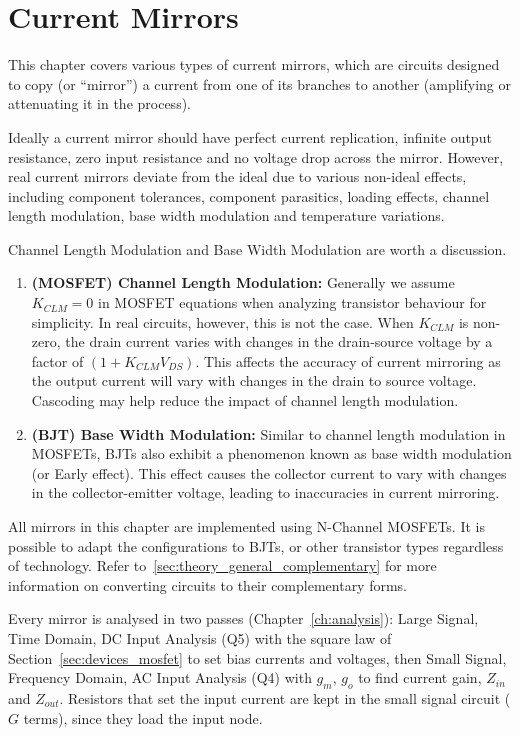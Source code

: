\chapter{Current Mirrors}\label{ch:Current_Mirrors}

This chapter covers various types of current mirrors,
which are circuits designed to copy (or ``mirror'') a current
from one of its branches to another (amplifying or attenuating
it in the process).

Ideally a current mirror should have perfect current
replication, infinite output resistance, zero input
resistance and no voltage drop across the mirror. However,
real current mirrors deviate from the ideal due to various
non-ideal effects, including component tolerances, component
parasitics, loading effects, channel length modulation,
base width modulation and temperature variations.

Channel Length Modulation and Base Width Modulation are
worth a discussion.
\begin{enumerate}
  \item \textbf{(MOSFET) Channel Length Modulation:} Generally
    we assume $K_{CLM} = 0$ in MOSFET equations when analyzing
    transistor behaviour for simplicity. In real circuits,
    however, this is not the case. When $K_{CLM}$ is non-zero,
    the drain current varies with changes in the drain-source
    voltage by a factor of $(1 + K_{CLM} V_{DS})$. This affects
    the accuracy of current mirroring as the output current
    will vary with changes in the drain to source voltage.
    Cascoding may help reduce the impact of channel length modulation.
  \item \textbf{(BJT) Base Width Modulation:} Similar to channel length
    modulation in MOSFETs, BJTs also exhibit a phenomenon
    known as base width modulation (or Early effect). This
    effect causes the collector current to vary with changes
    in the collector-emitter voltage, leading to inaccuracies
    in current mirroring.
\end{enumerate}

All mirrors in this chapter are implemented using N-Channel
MOSFETs. It is possible to adapt the configurations to
BJTs, or other transistor types regardless of technology.
Refer to~\ref{sec:theory_general_complementary} for more
information on converting circuits to their complementary
forms.

Every mirror is analysed in two passes (Chapter~\ref{ch:analysis}):
Large Signal, Time Domain, DC Input Analysis (Q5) with the square law of
Section~\ref{sec:devices_mosfet} to set bias currents and
voltages, then Small Signal, Frequency Domain, AC Input Analysis (Q4) with \(g_m\), \(g_o\) to find
current gain, \(Z_{in}\) and \(Z_{out}\). Resistors that set the
input current are kept in the small signal circuit (\(G\) terms),
since they load the input node.

